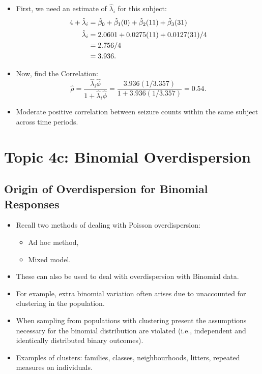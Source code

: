 \documentclass[oneside]{book}\usepackage[]{graphicx}\usepackage[svgnames]{xcolor}
\let\exp\relax%
\let\log\relax%
\begin{document}
\begin{itemize}
    \item First, we need an estimate of $ \hat{\lambda}_i $ for this subject:
          \begin{align*}
              \log{4}+\log{\hat{\lambda}_i}
                              & =\hat{\beta}_0+\hat{\beta}_1(0)+\hat{\beta}_2(11)+\hat{\beta}_3(31) \\
              \hat{\lambda}_i & =\exp{2.0601+0.0275(11)+0.0127(31)}/4                               \\
                              & =\exp{2.756}/4                                                      \\
                              & =3.936.
          \end{align*}
    \item Now, find the Correlation:
          \[ \hat{\rho}=\frac{\hat{\lambda}_i\hat{\phi}}{1+\hat{\lambda}_i\hat{\phi}}=\frac{3.936(1/3.357)}{1+3.936(1/3.357)}=0.54. \]
    \item Moderate positive correlation between seizure counts within the same subject
          across time periods.
\end{itemize}

\section*{Topic 4c: Binomial Overdispersion}
\subsection*{Origin of Overdispersion for Binomial Responses}
\begin{itemize}
    \item Recall two methods of dealing with Poisson overdispersion:
          \begin{itemize}
              \item Ad hoc method,
              \item Mixed model.
          \end{itemize}
    \item These can also be used to deal with overdispersion with Binomial data.
    \item For example, extra binomial variation often arises due to unaccounted for
          clustering in the population.
    \item When sampling from populations with clustering present the assumptions
          necessary for the binomial distribution are violated (i.e., independent and
          identically distributed binary outcomes).
    \item Examples of clusters: families, classes, neighbourhoods, litters, repeated measures
          on individuals.
\end{itemize}
\end{document}
